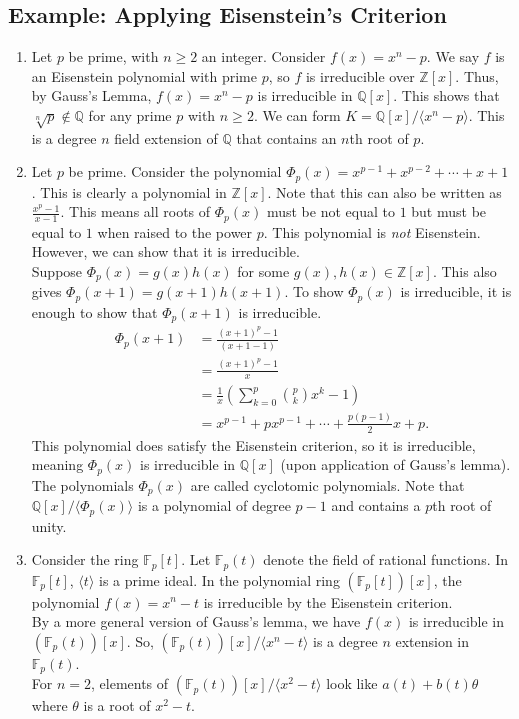 \documentclass[10pt]{extarticle}
\newcommand{\Q}{\mathbb{Q}}
\newcommand{\Z}{\mathbb{Z}}
\begin{document}
  \subsection{Example: Applying Eisenstein's Criterion}%
  \begin{enumerate}[(1)]
    \item Let $p$ be prime, with $n\geq 2$ an integer. Consider $f(x) = x^n - p$. We say $f$ is an Eisenstein polynomial with prime $p$, so $f$ is irreducible over $\Z[x]$. Thus, by Gauss's Lemma, $f(x) = x^n - p$ is irreducible in $\Q[x]$. This shows that $\sqrt[n]{p}\notin \Q$ for any prime $p$ with $n\geq 2$. We can form $K = \Q[x]/\langle x^n - p\rangle$. This is a degree $n$ field extension of $\Q$ that contains an $n$th root of $p$.
    \item Let $p$ be prime. Consider the polynomial $\Phi_{p}(x) = x^{p-1} + x^{p-2} + \cdots + x + 1$. This is clearly a polynomial in $\Z[x]$. Note that this can also be written as $\frac{x^p-1}{x-1}.$ This means all roots of $\Phi_{p}(x)$ must be not equal to $1$ but must be equal to $1$ when raised to the power $p$. This polynomial is \textit{not} Eisenstein. However, we can show that it is irreducible.\\

      Suppose $\Phi_p(x) = g(x)h(x)$ for some $g(x),h(x)\in \Z[x]$. This also gives $\Phi_p(x+1) = g(x+1)h(x+1)$. To show $\Phi_p(x)$ is irreducible, it is enough to show that $\Phi_p(x+1)$ is irreducible.
      \begin{align*}
        \Phi_p(x+1) &= \frac{(x+1)^p-1}{(x+1-1)}\\
                    &= \frac{(x+1)^p - 1}{x}\\
                    &= \frac{1}{x}\left(\sum_{k=0}^{p}{p\choose k}x^k - 1\right)\\
                    &= x^{p-1} + px^{p-1} + \cdots + \frac{p(p-1)}{2}x + p.
      \end{align*}
      This polynomial does satisfy the Eisenstein criterion, so it is irreducible, meaning $\Phi_{p}(x)$ is irreducible in $\Q[x]$ (upon application of Gauss's lemma).\\

      The polynomials $\Phi_p(x)$ are called cyclotomic polynomials. Note that $\Q[x]/\langle \Phi_p(x)\rangle$ is a polynomial of degree $p-1$ and contains a $p$th root of unity.
    \item Consider the ring $\mathbb{F}_{p}[t]$. Let $\mathbb{F}_p(t)$ denote the field of rational functions. In $\mathbb{F}_p[t]$, $\langle t \rangle$ is a prime ideal. In the polynomial ring $(\mathbb{F}_p[t])[x]$, the polynomial $f(x) = x^n - t$ is irreducible by the Eisenstein criterion.\\

      By a more general version of Gauss's lemma, we have $f(x)$ is irreducible in $(\mathbb{F}_p(t))[x]$. So, $(\mathbb{F}_p(t))[x]/\langle x^n - t \rangle$ is a degree $n$ extension in $\mathbb{F}_p(t)$.\\

      For $n = 2$, elements of $(\mathbb{F}_p(t))[x] /\langle x^2 - t \rangle$ look like $a(t) + b(t)\theta$ where $\theta$ is a root of $x^2 - t$.
  \end{enumerate}
\end{document}
